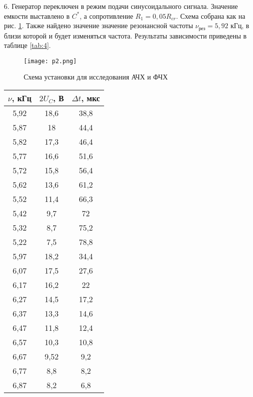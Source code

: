 6. Генератор переключен в режим подачи синусоидального сигнала. Значение емкости выставлено в $C^*$, а сопротивление $R_1 = 0,05R_{cr}$. Схема собрана как на рис. \ref{pic:p2}. Также найдено значение значение резонансной частоты $\nu_\text{рез} = 5,92$ кГц, в близи которой и будет изменяться частота. Результаты зависимости приведены в таблице \ref{tab:4}.
\begin{figure}[h]
    \centering
    \texttt{[image: p2.png]}
    \caption{Схема установки для исследования АЧХ и ФЧХ}
    \label{pic:p2}
\end{figure}
\begin{table}[h]
    \centering
    \begin{tabular}{|c|c|c|}
        \hline
        $\nu$, кГц & $2U_C$, В & $\Delta t$, мкс \\
        \hline
        5,92 & 18,6 & 38,8 \\
        \hline
        5,87 & 18 & 44,4 \\
        \hline
        5,82 & 17,3 & 46,4 \\
        \hline
        5,77 & 16,6 & 51,6 \\
        \hline
        5,72 & 15,8 & 56,4 \\
        \hline
        5,62 & 13,6 & 61,2 \\
        \hline
        5,52 & 11,4 & 66,3 \\
        \hline
        5,42 & 9,7 & 72 \\
        \hline
        5,32 & 8,7 & 75,2 \\
        \hline
        5,22 & 7,5 & 78,8 \\
        \hline
        5,97 & 18,2 & 34,4 \\
        \hline
        6,07 & 17,5 & 27,6 \\
        \hline
        6,17 & 16,2 & 22 \\
        \hline
        6,27 & 14,5 & 17,2 \\
        \hline
        6,37 & 13,3 & 14,6 \\
        \hline
        6,47 & 11,8 & 12,4 \\
        \hline
        6,57 & 10,3 & 10,8 \\
        \hline
        6,67 & 9,52 & 9,2 \\
        \hline
        6,77 & 8,8 & 8,2 \\
        \hline
        6,87 & 8,2 & 6,8 \\
        \hline
    \end{tabular}

\end{table}
